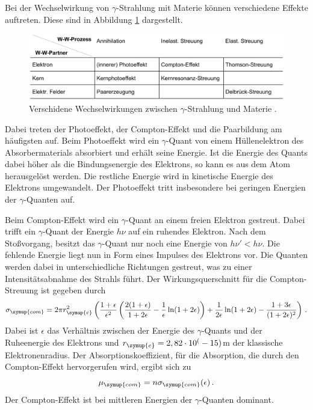 Bei der Wechselwirkung von $\gamma$-Strahlung mit Materie können verschiedene
Effekte auftreten. Diese sind in Abbildung \ref{fig:wechselwirkung} dargestellt.

\begin{figure}
  \centering
  \includegraphics[width=\textwidth]{data/wechselwirkung.png}
  \caption{Verschidene Wechselwirkungen zwischen $\gamma$-Strahlung und Materie \cite{Versuchsanleitung}.}
  \label{fig:wechselwirkung}
\end{figure}

Dabei treten der Photoeffekt, der Compton-Effekt und die Paarbildung am häufigsten auf.
Beim Photoeffekt wird ein $\gamma$-Quant von einem Hüllenelektron des Absorbermaterials
absorbiert und erhält seine Energie. Ist die Energie des Quants dabei höher als die
Bindungsenergie des Elektrons, so kann es aus dem Atom herausgelöst werden. Die
restliche Energie wird in kinetische Energie des Elektrons umgewandelt. Der Photoeffekt
tritt insbesondere bei geringen Energien der $\gamma$-Quanten auf.

Beim Compton-Effekt wird ein $\gamma$-Quant an einem freien Elektron gestreut.
Dabei trifft ein $\gamma$-Quant der Energie $h \nu$ auf ein ruhendes Elektron.
Nach dem Stoßvorgang, besitzt das $\gamma$-Quant nur noch eine Energie von $h \nu' < h \nu$.
Die fehlende Energie liegt nun in Form eines Impulses des Elektrons vor. Die Quanten
werden dabei in unterschiedliche Richtungen gestreut, was zu einer Intensitätsabnahme
des Strahls führt. Der Wirkungsquerschnitt für die Compton-Streuung ist gegeben
durch
\begin{equation}
  \sigma_{\symup{com}}= 2 \pi r_{\symup{e}}^2 \left(\frac{1+\epsilon}{\epsilon^2}
  \left(\frac{2(1+\epsilon)}{1+2\epsilon}-\frac{1}{\epsilon}\ln(1+2\epsilon)\right)
  +\frac{1}{2\epsilon}\ln(1+2\epsilon)-\frac{1+3\epsilon}{(1+2\epsilon)^2}\right) \,.
  \label{eqn:sigma_compton}
\end{equation}
Dabei ist $\epsilon$ das Verhältnis zwischen der Energie des $\gamma$-Quants und
der Ruheenergie des Elektrons und $r_{\symup{e}} = 2,82 \cdot 10^(-15)$m%
der klassische Elektronenradius. Der Absorptionskoeffizient, für die Absorption, die
durch den Compton-Effekt hervorgerufen wird, ergibt sich zu
\begin{equation}
  \mu_{\symup{com}}=n \sigma_{\symup{com}}(\epsilon) \,.
  \label{eqn:mucompton}
\end{equation}
Der Compton-Effekt ist bei mittleren Energien der $\gamma$-Quanten dominant.

